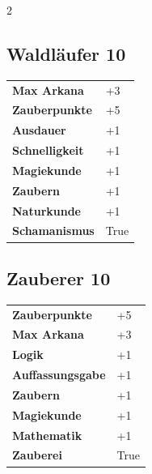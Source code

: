 \begin{multicols}{2}
\begin{tcolorbox}
\end{tcolorbox}

\begin{tcolorbox}
    \subsection*{Waldläufer \hfill \small{10 }}
    \tcblower




\begin{tabular}{@{}ll@{}}
    \textbf{Max Arkana} & +3\\
    \textbf{Zauberpunkte} & +5\\
    \textbf{Ausdauer} & +1\\
    \textbf{Schnelligkeit} & +1\\
    \textbf{Magiekunde} & +1\\
    \textbf{Zaubern} & +1\\
    \textbf{Naturkunde} & +1\\
    \textbf{Schamanismus} & True\\
\end{tabular}


\end{tcolorbox}

\begin{tcolorbox}
    \subsection*{Zauberer \hfill \small{10 }}
    \tcblower




\begin{tabular}{@{}ll@{}}
    \textbf{Zauberpunkte} & +5\\
    \textbf{Max Arkana} & +3\\
    \textbf{Logik} & +1\\
    \textbf{Auffassungsgabe} & +1\\
    \textbf{Zaubern} & +1\\
    \textbf{Magiekunde} & +1\\
    \textbf{Mathematik} & +1\\
    \textbf{Zauberei} & True\\
\end{tabular}


\end{tcolorbox}
\end{multicols}
